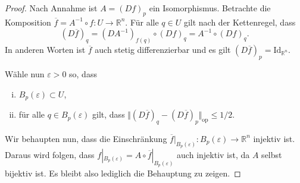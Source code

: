\documentclass[../main.tex]{subfiles}
\begin{document}
\begin{proof}
  Nach Annahme ist $A = {(Df)}_p$ ein Isomorphismus.
  Betrachte die Komposition
  $\overline f = A^{-1} \circ f \colon U \to \mathbb{R}^n$.
  Für alle $q \in U$ 
  gilt nach der Kettenregel, dass
  \[
    {(D \overline f)}_q = {(DA^{-1})}_{f(q)} \circ {(Df)}_q
    = A^{-1} \circ {(Df)}_q.
  \]
  In anderen Worten ist $\overline f$ auch stetig differenzierbar
  und es gilt
  \(
    {(D \overline f)}_p = \text{Id}_{\mathbb{R}^n}.
  \)

  Wähle nun $\varepsilon > 0$ so, dass
  \begin{enumerate}[(i)]
    \item $B_p(\varepsilon) \subset U$,
    \item für alle $q \in B_p(\varepsilon)$ gilt, dass
      \(
        \Vert {(D \overline f)}_q - {(D \overline f)}_p \Vert_{\text{op}}
          \leq 1/2
      \).
  \end{enumerate}
  Wir behaupten nun, dass die Einschränkung
  $ \overline f |_{B_p(\varepsilon)} \colon B_p(\varepsilon) \to \mathbb{R}^n$ 
  injektiv ist.
  Daraus wird folgen, dass $f |_{B_p(\varepsilon)} = A \circ
  \overline f |_{B_p(\varepsilon)}$ auch injektiv ist, da $A$ selbst
  bijektiv ist.
  Es bleibt also lediglich die Behauptung zu zeigen.


\end{proof}
\end{document}
